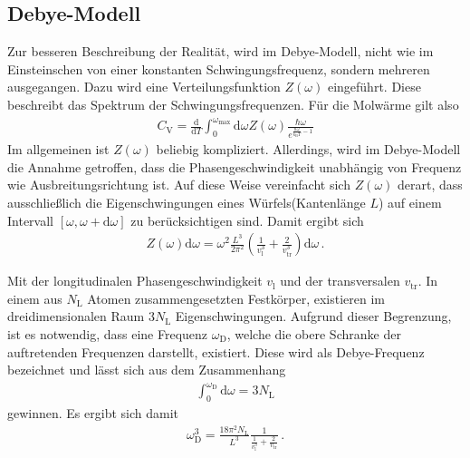 \subsection{Debye-Modell}
\label{subsec:debye}
Zur besseren Beschreibung der Realität, wird im Debye-Modell,
nicht wie im Einsteinschen von einer konstanten Schwingungsfrequenz,
sondern mehreren ausgegangen.
Dazu wird eine Verteilungsfunktion $Z(\omega)$ eingeführt.
Diese beschreibt das Spektrum der Schwingungsfrequenzen.
Für die Molwärme gilt also
\begin{align}
	C_{\text{V}} = \frac{\mathrm{d}}{\mathrm{d}T}
	\int_{0}^{\omega_{\text{max}}} \mathrm{d}\omega Z(\omega)
	\frac{\hbar \omega}{e^{\frac{\hbar \omega}{k_{\text{B}} T} - 1}} \label{eqn:t9}
\end{align}
Im allgemeinen ist $Z(\omega)$  beliebig kompliziert.
Allerdings, wird im Debye-Modell die Annahme getroffen,
dass die Phasengeschwindigkeit unabhängig von Frequenz wie
Ausbreitungsrichtung ist.
Auf diese Weise vereinfacht sich $Z(\omega)$ derart, dass
ausschließlich die Eigenschwingungen eines Würfels(Kantenlänge $L$)
auf einem Intervall $\left[ \omega, \omega + \mathrm{d}\omega \right]$
zu berücksichtigen sind.
Damit ergibt sich
\begin{align}
	Z(\omega) \mathrm{d}\omega =  \omega^{2} \frac{L^{3}}{2 \pi^{2}}
	\left( \frac{1}{v_{\text{l}}^{3}} +
	\frac{2}{v_{\text{tr}}^{3}} \right) \mathrm{d}\omega \, . \label{eqn:t10}
\end{align}

Mit der longitudinalen Phasengeschwindigkeit $v_{\text{l}}$
und der transversalen $v_{\text{tr}}$.
In einem aus $N_{\text{L}}$ Atomen zusammengesetzten Festkörper,
existieren im dreidimensionalen Raum $3N_{\text{L}}$ Eigenschwingungen.
Aufgrund dieser Begrenzung, ist es notwendig, dass eine
Frequenz $\omega_{\text{D}}$, welche die obere Schranke der auftretenden
Frequenzen darstellt, existiert.
Diese wird als Debye-Frequenz bezeichnet und lässt sich
aus dem Zusammenhang
\begin{align}
	\int_{0}^{\omega_{\text{D}}} \mathrm{d}\omega = 3 N_{\text{L}} \label{eqn:t11}
\end{align}
gewinnen.
Es ergibt sich damit
\begin{align}
	\omega_{\text{D}}^{3} = \frac{18 \pi^{2} N_{\text{L}}}{L^{3}}
	\frac{1}{\frac{1}{v_{\text{l}}^{3}} + \frac{2}{v_{\text{tr}}}} \, .\label{eqn:t12}
\end{align}

